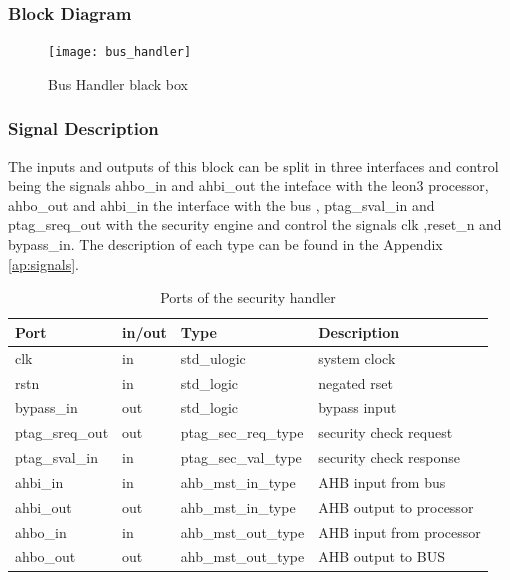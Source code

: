 \subsubsection{Block Diagram}

\begin{figure}[!ht]
	\centering
	\texttt{[image: bus\_handler]}
    \caption{Bus Handler  black box  }
	\label{fig:bhbb}
\end{figure}


\subsubsection{Signal Description}

The inputs and outputs of this block can be split in three interfaces and control being
the signals  ahbo\_in and ahbi\_out the inteface with the leon3 processor,  ahbo\_out  and ahbi\_in
the interface with the bus , ptag\_sval\_in and ptag\_sreq\_out with the security engine  and control
 the signals clk ,reset\_n and bypass\_in.
 The description of each type can be found in the Appendix \ref{ap:signals}.
\begin{table}[H]
\centering
\label{table:shports}
\begin{tabular}{l l l l}
\textbf{Port}   & \textbf{in/out} & \textbf{Type}        & \textbf{Description} 	\\ \hline \hline
clk             & in              & std\_ulogic          & system clock         	\\ \hline
rstn            & in              & std\_logic           & negated rset         	\\ \hline
bypass\_in      & out             & std\_logic           & bypass input         	\\ \hline
ptag\_sreq\_out & out             & ptag\_sec\_req\_type & security check request    	\\ \hline
ptag\_sval\_in  & in              & ptag\_sec\_val\_type & security check response  	\\ \hline
ahbi\_in        & in              & ahb\_mst\_in\_type   & AHB input from bus      	\\ \hline
ahbi\_out       & out             & ahb\_mst\_in\_type   & AHB output to processor      \\ \hline
ahbo\_in        & in              & ahb\_mst\_out\_type  & AHB input from processor    \\ \hline
ahbo\_out       & out             & ahb\_mst\_out\_type  & AHB output to BUS            \\ \hline
\end{tabular}
 \caption{Ports of the security handler}
\end{table}





